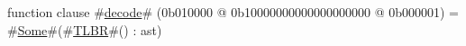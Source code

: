 function clause #\hyperref[zdecode]{decode}# (0b010000 @ 0b10000000000000000000 @ 0b000001) = #\hyperref[zSome]{Some}#(#\hyperref[zTLBR]{TLBR}#() : ast)

